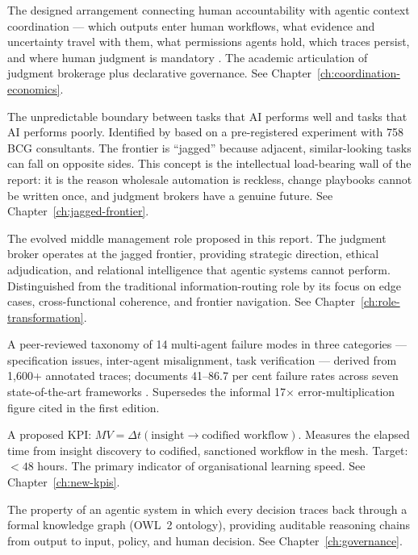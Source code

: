\begin{description}[style=nextline, leftmargin=2em, font=\bfseries\color{navyblue}]
\item[Interface Organisation]
The designed arrangement connecting human accountability with agentic context coordination --- which outputs enter human workflows, what evidence and uncertainty travel with them, what permissions agents hold, which traces persist, and where human judgment is mandatory \parencite{Liu2026}. The academic articulation of judgment brokerage plus declarative governance. See Chapter~\ref{ch:coordination-economics}.

\item[Jagged Frontier]
The unpredictable boundary between tasks that AI performs well and tasks that AI performs poorly. Identified by \textcite{DellAcqua2026} based on a pre-registered experiment with 758 BCG consultants. The frontier is ``jagged'' because adjacent, similar-looking tasks can fall on opposite sides. This concept is the intellectual load-bearing wall of the report: it is the reason wholesale automation is reckless, change playbooks cannot be written once, and judgment brokers have a genuine future. See Chapter~\ref{ch:jagged-frontier}.

\item[Judgment Broker]
The evolved middle management role proposed in this report. The judgment broker operates at the jagged frontier, providing strategic direction, ethical adjudication, and relational intelligence that agentic systems cannot perform. Distinguished from the traditional information-routing role by its focus on edge cases, cross-functional coherence, and frontier navigation. See Chapter~\ref{ch:role-transformation}.

\item[MAST (Multi-Agent System Failure Taxonomy)]
A peer-reviewed taxonomy of 14 multi-agent failure modes in three categories --- specification issues, inter-agent misalignment, task verification --- derived from 1,600+ annotated traces; documents 41--86.7 per cent failure rates across seven state-of-the-art frameworks \parencite{Cemri2025}. Supersedes the informal 17$\times$ error-multiplication figure cited in the first edition.

\item[Mesh Velocity (MV)]
A proposed KPI: $MV = \Delta t(\text{insight} \rightarrow \text{codified workflow})$. Measures the elapsed time from insight discovery to codified, sanctioned workflow in the mesh. Target: $<48$ hours. The primary indicator of organisational learning speed. See Chapter~\ref{ch:new-kpis}.

\item[Ontological Provenance]
The property of an agentic system in which every decision traces back through a formal knowledge graph (OWL~2 ontology), providing auditable reasoning chains from output to input, policy, and human decision. See Chapter~\ref{ch:governance}.


\end{description}

